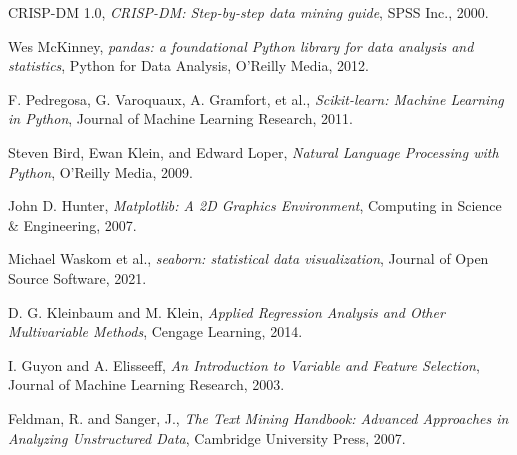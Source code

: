 \documentclass[
	a4paper, %
	10pt, %
	unnumberedsections, %
	twoside, %
]{LTJournalArticle}
\begin{document}
\begin{thebibliography}{9}

CRISP-DM 1.0,
\emph{CRISP-DM: Step-by-step data mining guide},
SPSS Inc.,
2000.

Wes McKinney,
\emph{pandas: a foundational Python library for data analysis and statistics},
Python for Data Analysis,
O'Reilly Media,
2012.

F. Pedregosa, G. Varoquaux, A. Gramfort, et al.,
\emph{Scikit-learn: Machine Learning in Python},
Journal of Machine Learning Research,
2011.

Steven Bird, Ewan Klein, and Edward Loper,
\emph{Natural Language Processing with Python},
O'Reilly Media,
2009.

John D. Hunter,
\emph{Matplotlib: A 2D Graphics Environment},
Computing in Science \& Engineering,
2007.

Michael Waskom et al.,
\emph{seaborn: statistical data visualization},
Journal of Open Source Software,
2021.

D. G. Kleinbaum and M. Klein,
\emph{Applied Regression Analysis and Other Multivariable Methods},
Cengage Learning,
2014.

I. Guyon and A. Elisseeff,
\emph{An Introduction to Variable and Feature Selection},
Journal of Machine Learning Research,
2003.

Feldman, R. and Sanger, J.,
\emph{The Text Mining Handbook: Advanced Approaches in Analyzing Unstructured Data},
Cambridge University Press,
2007.

\end{thebibliography}


\end{document}
